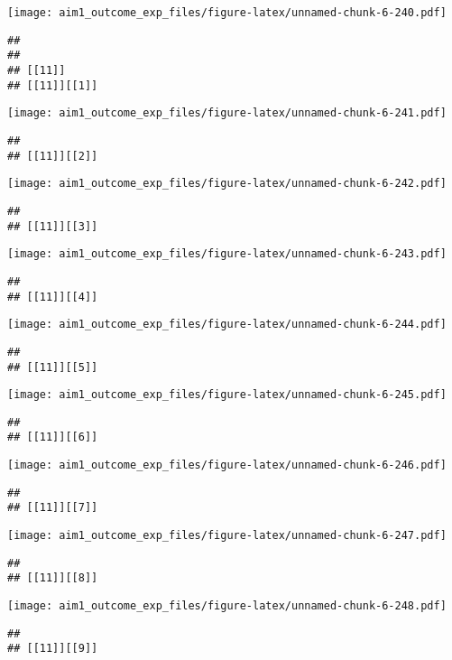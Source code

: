 \documentclass[
]{article}
\begin{document}
\texttt{[image: aim1\_outcome\_exp\_files/figure-latex/unnamed-chunk-6-240.pdf]}

\begin{verbatim}
## 
## 
## [[11]]
## [[11]][[1]]
\end{verbatim}

\texttt{[image: aim1\_outcome\_exp\_files/figure-latex/unnamed-chunk-6-241.pdf]}

\begin{verbatim}
## 
## [[11]][[2]]
\end{verbatim}

\texttt{[image: aim1\_outcome\_exp\_files/figure-latex/unnamed-chunk-6-242.pdf]}

\begin{verbatim}
## 
## [[11]][[3]]
\end{verbatim}

\texttt{[image: aim1\_outcome\_exp\_files/figure-latex/unnamed-chunk-6-243.pdf]}

\begin{verbatim}
## 
## [[11]][[4]]
\end{verbatim}

\texttt{[image: aim1\_outcome\_exp\_files/figure-latex/unnamed-chunk-6-244.pdf]}

\begin{verbatim}
## 
## [[11]][[5]]
\end{verbatim}

\texttt{[image: aim1\_outcome\_exp\_files/figure-latex/unnamed-chunk-6-245.pdf]}

\begin{verbatim}
## 
## [[11]][[6]]
\end{verbatim}

\texttt{[image: aim1\_outcome\_exp\_files/figure-latex/unnamed-chunk-6-246.pdf]}

\begin{verbatim}
## 
## [[11]][[7]]
\end{verbatim}

\texttt{[image: aim1\_outcome\_exp\_files/figure-latex/unnamed-chunk-6-247.pdf]}

\begin{verbatim}
## 
## [[11]][[8]]
\end{verbatim}

\texttt{[image: aim1\_outcome\_exp\_files/figure-latex/unnamed-chunk-6-248.pdf]}

\begin{verbatim}
## 
## [[11]][[9]]
\end{verbatim}
\end{document}
